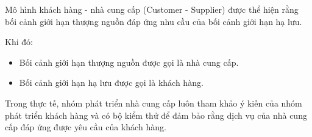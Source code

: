  Mô hình khách hàng - nhà cung cấp (Customer - Supplier)     được thể hiện       rằng  bối cảnh giới hạn thượng nguồn đáp ứng nhu cầu của bối cảnh giới hạn hạ lưu.


Khi đó:


\begin{itemize}
    \item       Bối cảnh giới hạn   thượng nguồn  được gọi là  nhà cung cấp.
    \item       Bối cảnh giới hạn   hạ lưu  được gọi là khách hàng.
\end{itemize}





Trong thực tế,   nhóm   phát triển   nhà cung cấp luôn tham khảo ý kiến của  nhóm   phát triển    khách hàng và    có bộ     kiểm thử     để đảm bảo rằng dịch vụ của      nhà cung cấp đáp ứng được yêu cầu của      khách hàng.    